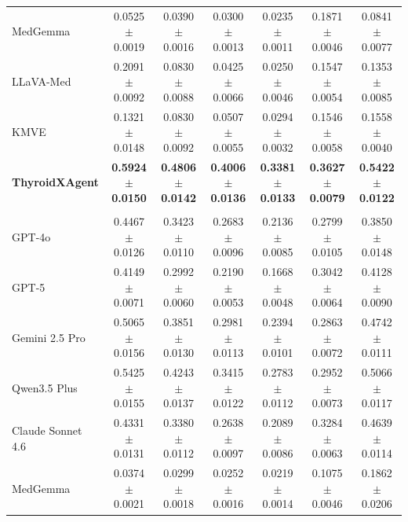 \documentclass[fleqn,10pt]{wlscirep}
\begin{document}
\begin{appendices}
\begin{table}[p]
\begin{threeparttable}
\begin{tabular}{lcccccc}
MedGemma~\cite{sellergren2025medgemma}
& 0.0525$\pm$0.0019
& 0.0390$\pm$0.0016
& 0.0300$\pm$0.0013
& 0.0235$\pm$0.0011
& 0.1871$\pm$0.0046
& 0.0841$\pm$0.0077 \\

LLaVA-Med~\cite{li_llavamed_2023}
& 0.2091$\pm$0.0092
& 0.0830$\pm$0.0088
& 0.0425$\pm$0.0066
& 0.0250$\pm$0.0046
& 0.1547$\pm$0.0054
& 0.1353$\pm$0.0085 \\

KMVE~\cite{li_ultrasound_2024}
& 0.1321$\pm$0.0148
& 0.0830$\pm$0.0092
& 0.0507$\pm$0.0055
& 0.0294$\pm$0.0032
& 0.1546$\pm$0.0058
& 0.1558$\pm$0.0040 \\

\rowcolor{lightgray}
\textbf{ThyroidXAgent}
& \textbf{0.5924$\pm$0.0150}
& \textbf{0.4806$\pm$0.0142}
& \textbf{0.4006$\pm$0.0136}
& \textbf{0.3381$\pm$0.0133}
& \textbf{0.3627$\pm$0.0079}
& \textbf{0.5422$\pm$0.0122} \\

\midrule

\rowcolor{gray!20}
\multicolumn{7}{c}{\textbf{KMVE Testset} ($n=492$)} \\

GPT-4o~\cite{openai_gpt4_2024}
& 0.4467$\pm$0.0126
& 0.3423$\pm$0.0110
& 0.2683$\pm$0.0096
& 0.2136$\pm$0.0085
& 0.2799$\pm$0.0105
& 0.3850$\pm$0.0148 \\

GPT-5~\cite{openai2025gpt5systemcard}
& 0.4149$\pm$0.0071
& 0.2992$\pm$0.0060
& 0.2190$\pm$0.0053
& 0.1668$\pm$0.0048
& 0.3042$\pm$0.0064
& 0.4128$\pm$0.0090 \\

Gemini 2.5 Pro~\cite{comanici_gemini_2025}
& 0.5065$\pm$0.0156
& 0.3851$\pm$0.0130
& 0.2981$\pm$0.0113
& 0.2394$\pm$0.0101
& 0.2863$\pm$0.0072
& 0.4742$\pm$0.0111 \\

Qwen3.5 Plus~\cite{yang_qwen3_2025}
& 0.5425$\pm$0.0155
& 0.4243$\pm$0.0137
& 0.3415$\pm$0.0122
& 0.2783$\pm$0.0112
& 0.2952$\pm$0.0073
& 0.5066$\pm$0.0117 \\

Claude Sonnet 4.6
& 0.4331$\pm$0.0131
& 0.3380$\pm$0.0112
& 0.2638$\pm$0.0097
& 0.2089$\pm$0.0086
& 0.3284$\pm$0.0063
& 0.4639$\pm$0.0114 \\

MedGemma~\cite{sellergren2025medgemma}
& 0.0374$\pm$0.0021
& 0.0299$\pm$0.0018
& 0.0252$\pm$0.0016
& 0.0219$\pm$0.0014
& 0.1075$\pm$0.0046
& 0.1862$\pm$0.0206 \\


\end{tabular}
\end{threeparttable}
\end{table}
\end{appendices}
\end{document}
